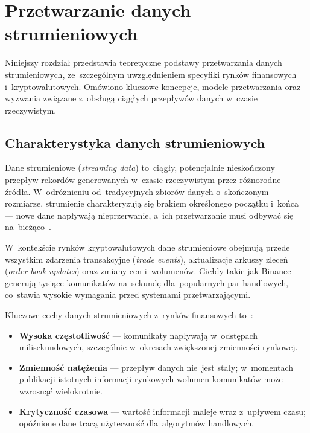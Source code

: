 \chapter{Przetwarzanie danych strumieniowych}
\label{ch:przetwarzanie_danych}

Niniejszy rozdział przedstawia teoretyczne podstawy przetwarzania danych strumieniowych, ze~szczególnym uwzględnieniem
specyfiki rynków finansowych i~kryptowalutowych.
Omówiono kluczowe koncepcje, modele przetwarzania oraz wyzwania związane z~obsługą ciągłych przepływów danych
w~czasie rzeczywistym.


\section{Charakterystyka danych strumieniowych}
\label{sec:charakterystyka_strumieni}

Dane strumieniowe (\textit{streaming data}) to~ciągły, potencjalnie nieskończony przepływ rekordów generowanych
w~czasie rzeczywistym przez różnorodne źródła.
W~odróżnieniu od~tradycyjnych zbiorów danych o~skończonym rozmiarze, strumienie charakteryzują się brakiem określonego
początku i~końca --- nowe dane napływają nieprzerwanie, a~ich przetwarzanie musi odbywać się na~bieżąco~\cite{data_stream_def}.

W~kontekście rynków kryptowalutowych dane strumieniowe obejmują przede wszystkim zdarzenia transakcyjne
(\textit{trade events}), aktualizacje arkuszy zleceń (\textit{order book updates}) oraz zmiany cen i~wolumenów.
Giełdy takie jak Binance generują tysiące komunikatów na~sekundę dla~popularnych par handlowych, co~stawia wysokie
wymagania przed systemami przetwarzającymi.

Kluczowe cechy danych strumieniowych z~rynków finansowych to~\cite{burst_events, time_value_curve, 8_requirements}:
\begin{itemize}
    \item \textbf{Wysoka częstotliwość} --- komunikaty napływają w~odstępach milisekundowych, szczególnie w~okresach
    zwiększonej zmienności rynkowej.
    \item \textbf{Zmienność natężenia} --- przepływ danych nie~jest stały; w~momentach publikacji istotnych informacji
    rynkowych wolumen komunikatów może wzrosnąć wielokrotnie.
    \item \textbf{Krytyczność czasowa} --- wartość informacji maleje wraz z~upływem czasu; opóźnione dane tracą
    użyteczność dla~algorytmów handlowych.
\end{itemize}


